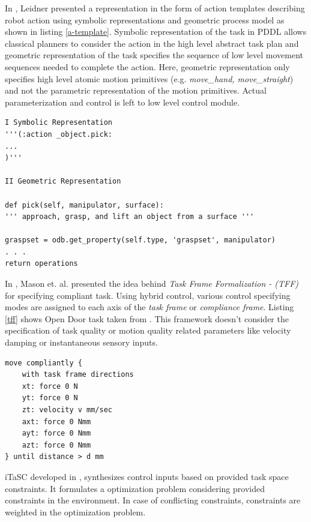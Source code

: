 \documentclass[thesis]{mas_proposal}
\begin{document}
In \cite{leidner2017cognitive}, Leidner presented a representation in the form of action templates describing robot action using symbolic representations and geometric process model as shown in listing \ref{a-template}.  Symbolic representation of the task in PDDL allows classical planners to consider the action in the high level abstract task plan and geometric representation of the task specifies the sequence of low level movement sequences needed to complete the action. Here, geometric representation only specifies high level atomic motion primitives (e.g. \textit{move\_hand, move\_straight}) and not the parametric representation of the motion primitives. Actual parameterization and control is left to low level control module.   

\begin{lstlisting}[label=a-template,caption=Action Template: \_object.pick]
I Symbolic Representation 
'''(:action _object.pick: 
...
)'''

II Geometric Representation

def pick(self, manipulator, surface):
''' approach, grasp, and lift an object from a surface '''

graspset = odb.get_property(self.type, 'graspset', manipulator) 
. . .
return operations
\end{lstlisting}

In \cite{mason1981compliance}, Mason et. al. presented the idea behind \textit{Task Frame Formalization - (TFF)} for specifying compliant task. Using hybrid control, various control specifying modes are assigned to each axis of the \textit{task frame} or \textit{compliance frame}\cite{nagele2018prototype}. Listing \ref{tff} shows Open Door task taken from \cite{bruyninckx1996specification}. This framework doesn't consider the specification of task quality or motion quality related parameters like velocity damping or instantaneous sensory inputs. 
\begin{lstlisting}[label=tff,caption=Task Specification using TFF: Open Door]
move compliantly {
	with task frame directions
	xt: force 0 N
	yt: force 0 N
	zt: velocity v mm/sec
	axt: force 0 Nmm
	ayt: force 0 Nmm
	azt: force 0 Nmm
} until distance > d mm 
\end{lstlisting}


iTaSC developed in \cite{DeSchutter-ijrr2007, DecreBruyninckxDeSchutter2013, decre09}, synthesizes control inputs based on provided task space constraints. It formulates a optimization problem considering provided constraints in the environment. In case of conflicting constraints, constraints are weighted in the optimization problem. 
\end{document}

